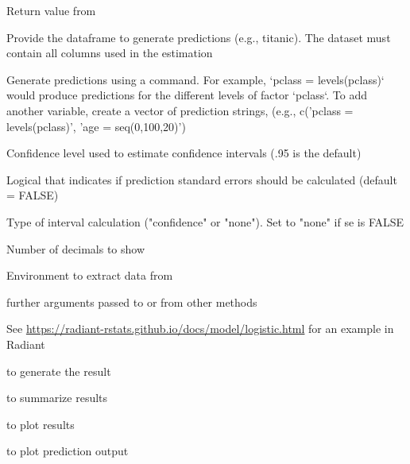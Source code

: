 \documentclass[a4paper]{book}
\begin{document}
\begin{Arguments}
\begin{ldescription}
\item[\code{object}] Return value from 

\item[\code{pred\_data}] Provide the dataframe to generate predictions (e.g., titanic). The dataset must contain all columns used in the estimation

\item[\code{pred\_cmd}] Generate predictions using a command. For example, `pclass = levels(pclass)` would produce predictions for the different levels of factor `pclass`. To add another variable, create a vector of prediction strings, (e.g., c('pclass = levels(pclass)', 'age = seq(0,100,20)')

\item[\code{conf\_lev}] Confidence level used to estimate confidence intervals (.95 is the default)

\item[\code{se}] Logical that indicates if prediction standard errors should be calculated (default = FALSE)

\item[\code{interval}] Type of interval calculation ("confidence" or "none"). Set to "none" if se is FALSE

\item[\code{dec}] Number of decimals to show

\item[\code{envir}] Environment to extract data from

\item[\code{...}] further arguments passed to or from other methods
\end{ldescription}
\end{Arguments}
%
\begin{Details}
See \url{https://radiant-rstats.github.io/docs/model/logistic.html} for an example in Radiant
\end{Details}
%
\begin{SeeAlso}
 to generate the result

 to summarize results

 to plot results

 to plot prediction output
\end{SeeAlso}
\end{document}
